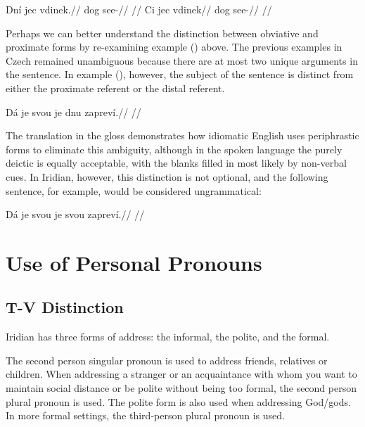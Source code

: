 \pex
\a
\begingl
\gla Dní jec vdinek.//
\glb {} dog see-//
\glft {}//
\endgl
\a \begingl
\gla Ci jec vdinek//
\glb {} dog see-//
\glft {}//
\endgl
\xe

Perhaps we can better understand the distinction between obviative and proximate forms by re-examining example () above. The previous examples in Czech remained unambiguous because there are at most two unique arguments in the sentence. In example (), however, the subject of the sentence is distinct from either the proximate referent or the distal referent.

\ex[exno={\getfullref{obv.obv1}}]
\begingl
\gla Dá je svou je dnu zapreví.//
\glft {}//
\endgl
\xe

The translation in the gloss demonstrates how idiomatic English uses periphrastic forms to eliminate this ambiguity, although in the spoken language the purely deictic  is equally acceptable, with the blanks filled in most likely by non-verbal cues. In Iridian, however, this distinction is not optional, and the following sentence, for example, would be considered ungrammatical:

\ex
\begingl
\gla *Dá je svou je svou zapreví.//
\glft {}//
\endgl
\xe

\section{Use of Personal Pronouns}

\subsection{T-V Distinction}

Iridian has three forms of address: the informal, the polite, and the formal.

The second person singular pronoun  is used to address friends, relatives or children. When addressing a stranger or an acquaintance with whom you want to maintain social distance or be polite without being too formal, the second person plural pronoun  is used. The polite form is also used when addressing God/gods. In more formal settings, the third-person plural pronoun  is used.



